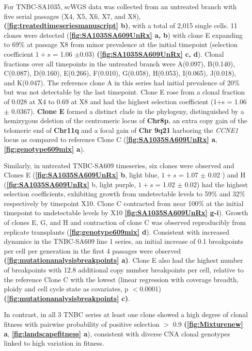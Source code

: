For TNBC-SA1035, scWGS data was collected from an untreated branch with five serial passages (X4, X5, X6, X7, and X8), \textbf{(\autoref{fig:treatedtimeseriesmanuscript} b)}, with a total of 2,015 single cells. 11 clones were detected (\textbf{\autoref{fig:SA1035SA609UnRx} a, b}) with clone E expanding to 69\% at passage X8 from minor prevalence at the initial timepoint (selection coefficient $1+s$ = 1.06 $\pm$0.03) \textbf{(\autoref{fig:SA1035SA609UnRx} c, d}). Clonal fractions over all timepoints in the untreated branch were A(0.097), B(0.140), C(0.087), D(0.160), E(0.266), F(0.010), G(0.058), H(0.053), I(0.065), J(0.018), and K(0.047). The reference clone A in this series had initial prevalence of 20\% but was not detectable by the last timepoint. Clone E rose from a clonal fraction of 0.028 at X4 to 0.69 at X8 and had the highest selection coefficient (1+s = 1.06 $\pm$ 0.0367). \textbf{Clone E} formed a distinct clade in the phylogeny, distinguished by a hemizygous deletion of the centromeric locus of \textbf{Chr8p}, an extra copy gain of the telomeric end of \textbf{Chr11q} and a focal gain of \textbf{Chr 9q21} harboring the \textit{CCNE1} locus as compared to reference Clone C (\textbf{\autoref{fig:SA1035SA609UnRx} a}, \textbf{\autoref{fig:genotype609mix} a}).

 
 Similarly, in untreated TNBC-SA609 timeseries, six clones were observed and Clones E (\textbf{\autoref{fig:SA1035SA609UnRx} b}, light blue, $1+s$ = 1.07 $\pm$ 0.02 ) and H (\textbf{\autoref{fig:SA1035SA609UnRx}} b, light purple, $1+s$ = 1.02 $\pm$ 0.02) had the highest selection coefficients, exhibiting growth from undetectable levels to 59\% and 32\% respectively by timepoint X10.
 Clone C contracted from near 100\% at the initial timepoint to undetectable levels by X10 \textbf{\autoref{fig:SA1035SA609UnRx} g-i}). Growth of clones E, G, and H and contraction of clone C was observed reproducibly from replicate transplants (\textbf{\autoref{fig:genotype609mix} d}).
 Consistent with increased dynamics in the TNBC-SA609 line 1 series, an initial increase of 0.1 breakpoints per cell per generation in the first 4 passages were observed \textbf{(\autoref{fig:mutationanalysisbreakpoints} a)}.
 Clone E also had the highest number of breakpoints with 12.8 additional copy number breakpoints per cell, relative to the reference Clone C with the lowest (linear regression with coverage breadth, ploidy and cell cycle state as covariates, p $<$0.0001) \textbf{(\autoref{fig:mutationanalysisbreakpoints} c)}.

In contrast, in all 3 TNBC series at least one clone showed a high degree of clonal fitness with pairwise probability of positive selection $>$ 0.9  \textbf{(\autoref{fig:Mixturenew} a}, \textbf{\autoref{fig:landscapefitness} a}), consistent with diverse CNA clonal genotypes linked to high variation in fitness.

